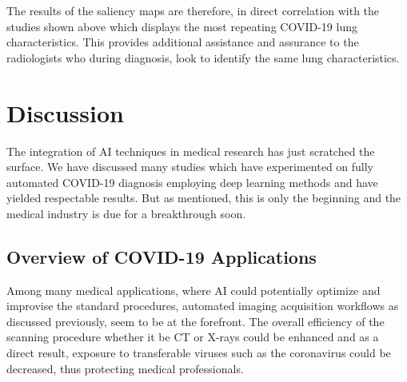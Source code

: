 \vspace{-2em}



The results of the saliency maps are therefore, in direct 
correlation with the studies shown above which displays 
the most repeating COVID-19 lung characteristics. This provides 
additional assistance and assurance to the radiologists who during 
diagnosis, look to identify the same lung characteristics.

\section{Discussion}
The integration of AI techniques in medical research has 
just scratched the surface. We have discussed many studies 
which have experimented on fully automated COVID-19 
diagnosis employing deep learning methods and have 
yielded respectable results. But as mentioned, this is 
only the beginning and the medical industry is due for a 
breakthrough soon. 

\subsection{Overview of COVID-19 Applications}

Among many medical applications, where AI could potentially 
optimize and improvise the standard procedures, automated 
imaging acquisition workflows as discussed previously, seem to be at the forefront. The overall efficiency of the scanning procedure 
whether it be CT or X-rays could be enhanced and as a direct result, 
exposure to transferable viruses such as the coronavirus could be 
decreased, thus protecting medical professionals. 

